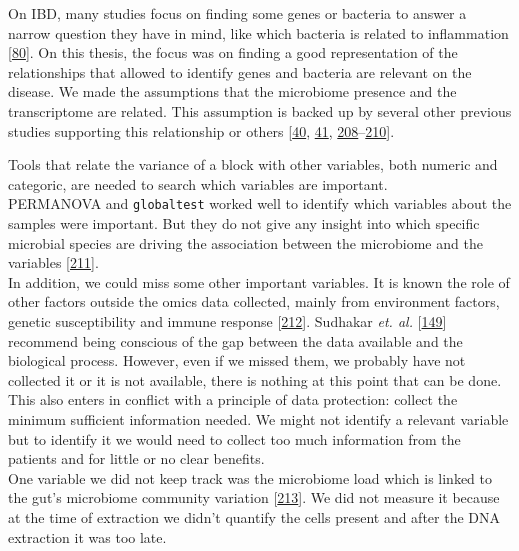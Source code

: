 \documentclass[
  a4paper,
]{book}
\begin{document}
On IBD, many studies focus on finding some genes or bacteria to answer a narrow question they have in mind, like which bacteria is related to inflammation {[}\protect\hyperlink{ref-tang2017}{80}{]}.
On this thesis, the focus was on finding a good representation of the relationships that allowed to identify genes and bacteria are relevant on the disease.
We made the assumptions that the microbiome presence and the transcriptome are related.
This assumption is backed up by several other previous studies supporting this relationship or others {[}\protect\hyperlink{ref-thomas1998}{40}, \protect\hyperlink{ref-cornish2008}{41}, \protect\hyperlink{ref-holmes2012}{208}--\protect\hyperlink{ref-brand2021}{210}{]}.

Tools that relate the variance of a block with other variables, both numeric and categoric, are needed to search which variables are important.\\
PERMANOVA and \texttt{globaltest} worked well to identify which variables about the samples were important.
But they do not give any insight into which specific microbial species are driving the association between the microbiome and the variables {[}\protect\hyperlink{ref-susin2020}{211}{]}.\\
In addition, we could miss some other important variables.
It is known the role of other factors outside the omics data collected, mainly from environment factors, genetic susceptibility and immune response {[}\protect\hyperlink{ref-sartor2006}{212}{]}.
Sudhakar \emph{et. al.} {[}\protect\hyperlink{ref-sudhakar2022}{149}{]} recommend being conscious of the gap between the data available and the biological process.
However, even if we missed them, we probably have not collected it or it is not available, there is nothing at this point that can be done.
This also enters in conflict with a principle of data protection: collect the minimum sufficient information needed.
We might not identify a relevant variable but to identify it we would need to collect too much information from the patients and for little or no clear benefits.\\
One variable we did not keep track was the microbiome load which is linked to the gut's microbiome community variation {[}\protect\hyperlink{ref-vandeputte2017}{213}{]}.
We did not measure it because at the time of extraction we didn't quantify the cells present and after the DNA extraction it was too late.
\end{document}
